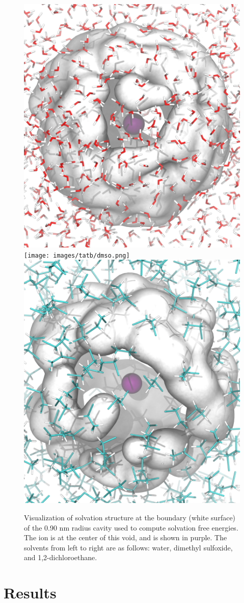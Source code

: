 \begin{tatb}
\begin{figure}
 \begin{center}
  \includegraphics[width=0.30\linewidth]{images/tatb/wat.png}
  \texttt{[image: images/tatb/dmso.png]}
  \includegraphics[width=0.30\linewidth]{images/tatb/dce.png}
  \caption[Snapshots of solvents with cavity volume excluded]{\label{fig:expelled_volume}Visualization of solvation structure at the boundary (white surface) 
  of the 0.90 nm radius cavity used to compute solvation free energies. The ion is at the center of this void, and is shown in purple. The solvents from left to 
  right are as follows: water, dimethyl sulfoxide, and 1,2-dichloroethane.}
 \end{center}
\end{figure}
 
  \section{\label{ch6:sec2:level1}Results~}


\end{tatb}
